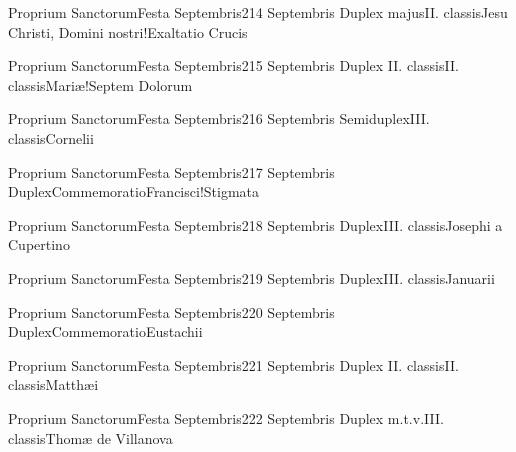 \documentclass[liber-responsorialis.tex]{subfiles}
\begin{document}
	{Proprium Sanctorum}{Festa Septembris}{2}{14 Septembris}
	{Duplex majus}{II. classis}{Jesu Christi, Domini nostri!Exaltatio Crucis}
	{}
	{}

	{Proprium Sanctorum}{Festa Septembris}{2}{15 Septembris}
	{Duplex II. classis}{II. classis}{Mariæ!Septem Dolorum}
	{}
	{}

	{Proprium Sanctorum}{Festa Septembris}{2}{16 Septembris}
	{Semiduplex}{III. classis}{Cornelii}
	{\pmexrubric}
	{\respdetemp}

	{Proprium Sanctorum}{Festa Septembris}{2}{17 Septembris}
	{Duplex}{Commemoratio}{Francisci!Stigmata}
	{\conprubric}
	{\respdetemp}

	{Proprium Sanctorum}{Festa Septembris}{2}{18 Septembris}
	{Duplex}{III. classis}{Josephi a Cupertino}
	{\conprubric}
	{\respdetemp}

	{Proprium Sanctorum}{Festa Septembris}{2}{19 Septembris}
	{Duplex}{III. classis}{Januarii}
	{\pmexrubric}
	{\respdetemp}

	{Proprium Sanctorum}{Festa Septembris}{2}{20 Septembris}
	{Duplex}{Commemoratio}{Eustachii}
	{\pmexrubric}
	{\respdetemp}

	{Proprium Sanctorum}{Festa Septembris}{2}{21 Septembris}
	{Duplex II. classis}{II. classis}{Matthæi}
	{}
	{}
\rubric{\apexrubric}

	{Proprium Sanctorum}{Festa Septembris}{2}{22 Septembris}
	{Duplex m.t.v.}{III. classis}{Thomæ de Villanova}
	{\coporubric}
	{\respdetemp}
\end{document}
